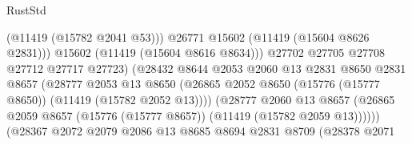 \begin{lexlean}{RustStd}
\begin{coremodule}
                                                (@11419 (@15782 @2041 @53)))
                                              @26771
                                              @15602
                                              (@11419 (@15604 @8626 @2831)))
                                            @15602
                                            (@11419 (@15604 @8616 @8634)))
                                          @27702
                                          @27705
                                          @27708
                                          @27712
                                          @27717
                                          @27723)
                                        (@28432
                                          @8644
                                          @2053
                                          @2060
                                          @13
                                          @2831
                                          @8650
                                          @2831
                                          @8657
                                          (@28777
                                            @2053
                                            @13
                                            @8650
                                            (@26865
                                              @2052
                                              @8650
                                              (@15776 (@15777 @8650))
                                              (@11419 (@15782 @2052 @13))))
                                          (@28777
                                            @2060
                                            @13
                                            @8657
                                            (@26865
                                              @2059
                                              @8657
                                              (@15776 (@15777 @8657))
                                              (@11419 (@15782 @2059 @13))))))
                                      (@28367
                                        @2072
                                        @2079
                                        @2086
                                        @13
                                        @8685
                                        @8694
                                        @2831
                                        @8709
                                        (@28378
                                          @2071

\end{coremodule}
\end{lexlean}
